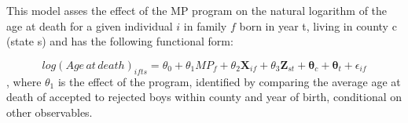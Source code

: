 This model asses the effect of the MP program on the natural logarithm of the age at death for a given individual $i$ in family $f$ born in year t, living in county c (state s) and has the following functional form:

$$
log(Age\,at\,death)_{ifts} = \theta_0 + \theta_1MP_f + \theta_2\mathbf{X}_{if} + \theta_3\mathbf{Z}_{st} + \mathbf{\theta}_c + \mathbf{\theta}_t + \epsilon_{if}
$$
, where $\theta_1$ is the effect of the program, identified by comparing the average age at death of accepted to rejected boys within county and year of birth, conditional on other observables.